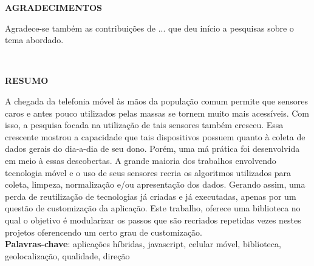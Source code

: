 \documentclass[12pt]{report} %
\begin{document}
	\pagebreak
	
	
	{\fontsize{16pt}{\baselineskip}\selectfont \textbf{AGRADECIMENTOS}}
	\vspace*{10em}%
	\begin{flushright}
		\begin{minipage}{0.5\textwidth}
			\normalsize
			Agradece-se também as contribuições de ... que deu início a pesquisas sobre o tema abordado.
		\end{minipage}\\[1.5cm]
	\end{flushright}
	
	\pagebreak
	
	
	\begin{center}
		{\fontsize{16pt}{\baselineskip}\selectfont \textbf{RESUMO}}\\[2em]
	\end{center}
	
	\justifying 
	\noindent
	A chegada da telefonia móvel às mãos da população comum permite que sensores caros e antes pouco utilizados pelas massas se tornem muito mais acessíveis. Com isso, a pesquisa focada na utilização de tais sensores também cresceu. Essa crescente mostrou a capacidade que tais dispositivos possuem quanto à coleta de dados gerais do dia-a-dia de seu dono. Porém, uma má prática foi desenvolvida em meio à essas descobertas. A grande maioria dos trabalhos envolvendo tecnologia móvel e o uso de seus sensores recria os algoritmos utilizados para coleta, limpeza, normalização e/ou apresentação dos dados. Gerando assim, uma perda de reutilização de tecnologias já criadas e já executadas, apenas por um questão de customização da aplicação. Este trabalho, oferece uma biblioteca no qual o objetivo é modularizar os passos que são recriados repetidas vezes nestes projetos oferencendo um certo grau de customização.  
	\\[3em]
	
	\normalsize\noindent
	\textbf{Palavras-chave}: aplicações híbridas, javascript, celular móvel, biblioteca, geolocalização, qualidade, direção
	
\end{document}
